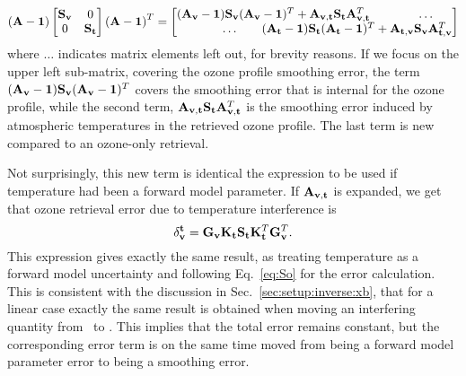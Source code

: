 \begin{displaymath}
  \left(\AvrKrnMtr-\IdnMtr\right)
  \begin{bmatrix}
    \aCvrMtr{\VctStl{v}} & 0 \\
    0 & \aCvrMtr{\VctStl{t}} 
  \end{bmatrix} 
  \left(\AvrKrnMtr-\IdnMtr\right)^T =
  \begin{bmatrix}
    (\AvrKrnMtr_{\VctStl{v}}-\IdnMtr)\aCvrMtr{\VctStl{v}}
    (\AvrKrnMtr_{\VctStl{v}}-\IdnMtr)^T + 
    \AvrKrnMtr_{\VctStl{v},\VctStl{t}}\aCvrMtr{\VctStl{t}}\AvrKrnMtr_{\VctStl{v},\VctStl{t}}^T
    & \hspace{5mm}\dots \\
    \hspace{-25mm}\dots & \hspace{-35mm}%
    (\AvrKrnMtr_{\VctStl{t}}-\IdnMtr)\aCvrMtr{\VctStl{t}}
    (\AvrKrnMtr_{\VctStl{t}}-\IdnMtr)^T + 
    \AvrKrnMtr_{\VctStl{t},\VctStl{v}}\aCvrMtr{\VctStl{v}}\AvrKrnMtr_{\VctStl{t},\VctStl{v}}^T
  \end{bmatrix} 
\end{displaymath}
where $\dots$ indicates matrix elements left out, for brevity reasons. If we
focus on the upper left sub-matrix, covering the ozone profile smoothing error,
the term $(\mathbf{A}_{\mathbf{v}}-\mathbf{1})\mathbf{S}_{\mathbf{v}}
(\mathbf{A}_{\mathbf{v}}-\mathbf{1})^T$ covers the smoothing error that is
internal for the ozone profile, while the second term,
$\mathbf{A}_{\mathbf{v},\mathbf{t}}\mathbf{S}_{\mathbf{t}}\mathbf{A}_{\mathbf{v},\mathbf{t}}^T$
is the smoothing error induced by atmospheric temperatures in the retrieved
ozone profile. The last term is new compared to an ozone-only retrieval.

Not surprisingly, this new term is identical the expression to be used if
temperature had been a forward model parameter. If
$\mathbf{A}_{\mathbf{v},\mathbf{t}}$ is expanded, we get that ozone retrieval
error due to temperature interference is
\begin{displaymath}
  \delta_{\mathbf{v}}^{\mathbf{t}} =
  \mathbf{G}_{\mathbf{v}}\mathbf{K}_{\mathbf{t}}\mathbf{S}_{\mathbf{t}}
   \mathbf{K}_{\mathbf{t}}^T\mathbf{G}_{\mathbf{v}}^T.
\end{displaymath}
This expression gives exactly the same result, as treating temperature as a
forward model uncertainty and following Eq.~\ref{eq:So} for the error
calculation. This is consistent with the discussion in
Sec.~\ref{sec:setup:inverse:xb}, that for a linear case exactly the same result
is obtained when moving an interfering quantity from \FrwMdlVct\ to \SttVct.
This implies that the total error remains constant, but the corresponding error
term is on the same time moved from being a forward model parameter error to
being a smoothing error. 

